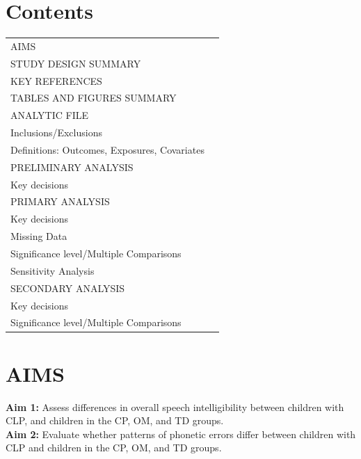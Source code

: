 \documentclass{article}
\begin{document}
\section*{Contents}
\begin{tabular}{@{}p{15.5cm}@{\hfill}r@{}}
AIMS & \pageref{sec:aims} \\
STUDY DESIGN SUMMARY & \pageref{sec:summary} \\
KEY REFERENCES & \pageref{sec:refs} \\
TABLES AND FIGURES SUMMARY & \pageref{sec:tables} \\
ANALYTIC FILE & \pageref{sec:analytic} \\
\quad Inclusions/Exclusions & \pageref{sec:inclusions} \\
\quad Definitions: Outcomes, Exposures, Covariates & \pageref{sec:definitions} \\
PRELIMINARY ANALYSIS & \pageref{sec:prelim} \\
\quad Key decisions & \pageref{sec:prelim-decisions} \\
PRIMARY ANALYSIS & \pageref{sec:primary} \\
\quad Key decisions & \pageref{sec:primary-decisions} \\
\quad Missing Data & \pageref{sec:missing} \\
\quad Significance level/Multiple Comparisons & \pageref{sec:significance} \\
\quad Sensitivity Analysis & \pageref{sec:sensitivity} \\
SECONDARY ANALYSIS & \pageref{sec:secondary} \\
\quad Key decisions & \pageref{sec:secondary-decisions} \\
\quad Significance level/Multiple Comparisons & \pageref{sec:secondary-significance} \\
\end{tabular}


\newpage

\section*{AIMS}\label{sec:aims}

\textbf{Aim 1:} Assess differences in overall speech intelligibility between children with CLP, and children in the CP, OM, and TD groups. \\[0.5em]
\textbf{Aim 2:} Evaluate whether patterns of phonetic errors differ between children with CLP and children in the CP, OM, and TD groups.
\end{document}
